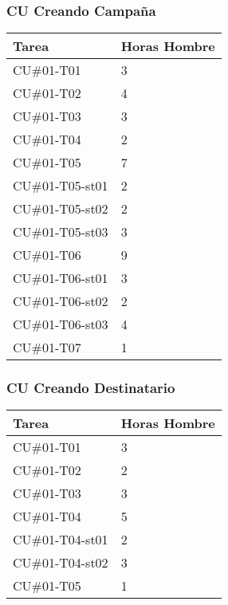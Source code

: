 \documentclass[a4paper, 11pt]{article}
\begin{document}
\subsubsection{CU Creando Campa\~na}
\begin{tabular}{| p{5cm} | p{5cm} |}

\hline
\bf{Tarea} & \bf{Horas Hombre} \\ \hline \hline
CU\#01-T01 &  3 \\ \hline
CU\#01-T02 &  4 \\ \hline
CU\#01-T03 &  3 \\ \hline
CU\#01-T04 &  2 \\ \hline
CU\#01-T05 &  7 \\ \hline
CU\#01-T05-st01 & 2 \\ \hline
CU\#01-T05-st02 & 2 \\ \hline
CU\#01-T05-st03 & 3 \\ \hline
CU\#01-T06 &  9 \\ \hline
CU\#01-T06-st01 & 3 \\ \hline
CU\#01-T06-st02 & 2 \\ \hline
CU\#01-T06-st03 & 4 \\ \hline
CU\#01-T07 &  1 \\ \hline
\end{tabular}

\subsubsection{CU Creando Destinatario}
\begin{tabular}{| p{5cm} | p{5cm} |}

\hline
\bf{Tarea} & \bf{Horas Hombre} \\ \hline \hline
CU\#01-T01 & 3 \\ \hline
CU\#01-T02 & 2 \\ \hline
CU\#01-T03 & 3 \\ \hline
CU\#01-T04 & 5 \\ \hline
CU\#01-T04-st01 & 2 \\ \hline
CU\#01-T04-st02 & 3 \\ \hline
CU\#01-T05 & 1 \\ \hline
\end{tabular}

\end{document}
